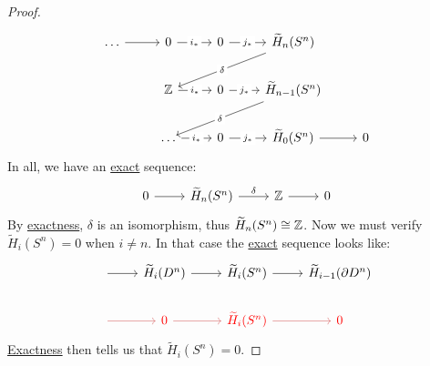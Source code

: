 \begin{proof}
	\[
		\begin{tikzcd}
			\ldots & {0} & {0} & {\widetilde{H}_n(S^n)} \\
			& {\mathbb{\MakeUppercase{z}} } & {0} & {\widetilde{H}_{n-1}(S^n)} \\
			& \ldots & {0} & {\widetilde{H}_{0}(S^n)} & 0
			\arrow["{j_\ast}"{description}, from=1-3, to=1-4]
			\arrow["{j_\ast}"{description}, from=2-3, to=2-4]
			\arrow[from=3-4, to=3-5]
			\arrow["{i_\ast}"{description}, from=2-2, to=2-3]
			\arrow["{i_\ast}"{description}, from=1-2, to=1-3]
			\arrow[from=1-1, to=1-2]
			\arrow["\delta"{description}, from=1-4, to=2-2]
			\arrow["\delta"{description}, from=2-4, to=3-2]
			\arrow["{j_\ast}"{description}, from=3-3, to=3-4]
			\arrow["{i_\ast}"{description}, from=3-2, to=3-3]
		\end{tikzcd}
	\]
	In all, we have an \hyperref[def:exact]{exact} sequence:
	\[
		\begin{tikzcd}
			0 & {\widetilde{H}_n(S^n)} & {\mathbb{Z}} & 0
			\arrow["\delta", from=1-2, to=1-3]
			\arrow[from=1-3, to=1-4]
			\arrow[from=1-1, to=1-2]
		\end{tikzcd}
	\]
	By \hyperref[def:exact]{exactness}, \(\delta\) is an isomorphism, thus \(\widetilde{H}_n(S^n) \cong \mathbb{\MakeUppercase{z}}\). Now we must verify \(\widetilde{H}_i(S^n) = 0\)
	when \(i\neq n\). In that case the \hyperref[def:exact]{exact} sequence looks like:
	\[
		\begin{tikzcd}
			{} & {\widetilde{H}_i(D^n)} & {\widetilde{H}_i(S^n)} & {\widetilde{H}_{i-1}(\partial D^n)} \\
			{} & \color{red}0 & \color{red}{\widetilde{H}_i(S^n)} & \color{red}0
			\arrow[from=1-2, to=1-3]
			\arrow[from=1-3, to=1-4]
			\arrow[from=1-1, to=1-2]
			\arrow[color={rgb,255:red,214;green,92;blue,92}, from=2-1, to=2-2]
			\arrow[color={rgb,255:red,214;green,92;blue,92}, from=2-2, to=2-3]
			\arrow[color={rgb,255:red,214;green,92;blue,92}, from=2-3, to=2-4]
		\end{tikzcd}
	\]
	\hyperref[def:exact]{Exactness} then tells us that \(\widetilde{H}_i(S^n) = 0\).
\end{proof}

